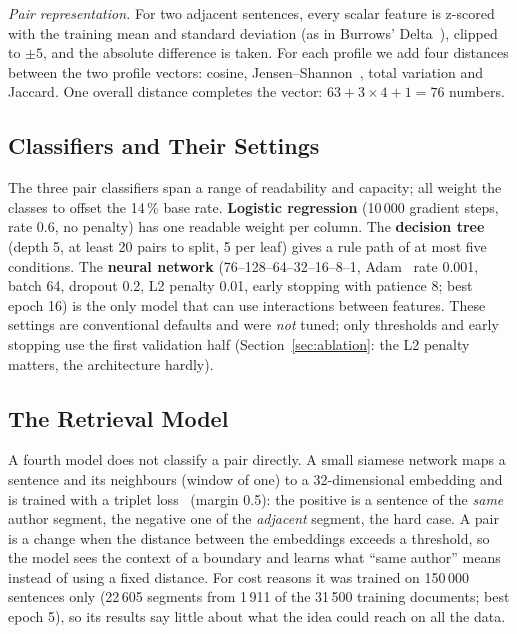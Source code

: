 \documentclass[runningheads]{llncs}
\begin{document}
\emph{Pair representation.} For two adjacent sentences, every scalar feature is z-scored with the training mean and standard deviation (as in Burrows' Delta~\cite{burrows2002delta}), clipped to $\pm 5$, and the absolute difference is taken. For each profile we add four distances between the two profile vectors: cosine, Jensen--Shannon~\cite{lin1991divergence}, total variation and Jaccard. One overall distance completes the vector: $63 + 3\times 4 + 1 = 76$ numbers.

\subsection{Classifiers and Their Settings}

The three pair classifiers span a range of readability and capacity; all weight the classes to offset the 14\,\% base rate. \textbf{Logistic regression} (10\,000 gradient steps, rate 0.6, no penalty) has one readable weight per column. The \textbf{decision tree}~\cite{breiman1984cart} (depth 5, at least 20 pairs to split, 5 per leaf) gives a rule path of at most five conditions. The \textbf{neural network} (76--128--64--32--16--8--1, Adam~\cite{kingma2015adam} rate 0.001, batch 64, dropout 0.2, L2 penalty 0.01, early stopping with patience 8; best epoch 16) is the only model that can use interactions between features. These settings are conventional defaults and were \emph{not} tuned; only thresholds and early stopping use the first validation half (Section~\ref{sec:ablation}: the L2 penalty matters, the architecture hardly).

\subsection{The Retrieval Model}

A fourth model does not classify a pair directly. A small siamese network maps a sentence and its neighbours (window of one) to a 32-dimensional embedding and is trained with a triplet loss~\cite{schroff2015facenet} (margin 0.5): the positive is a sentence of the \emph{same} author segment, the negative one of the \emph{adjacent} segment, the hard case. A pair is a change when the distance between the embeddings exceeds a threshold, so the model sees the context of a boundary and learns what ``same author'' means instead of using a fixed distance. For cost reasons it was trained on 150\,000 sentences only (22\,605 segments from 1\,911 of the 31\,500 training documents; best epoch 5), so its results say little about what the idea could reach on all the data.
\end{document}
